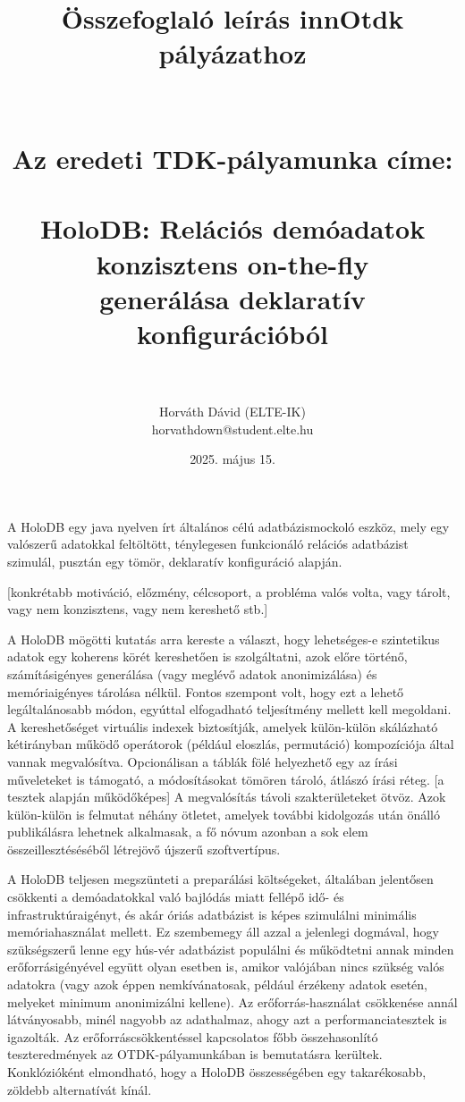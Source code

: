 \documentclass[12pt]{article}
\title{Összefoglaló leírás innOtdk pályázathoz \\ ~ \\ ~ \\ {\Large Az eredeti TDK-pályamunka címe: \\ ~ \\ HoloDB: Relációs demóadatok konzisztens on-the-fly \\ generálása deklaratív konfigurációból} \\ ~}
\author{Horváth Dávid (ELTE-IK) \\ horvathdown@student.elte.hu}
\date{2025. május 15.}
\begin{document}
\begin{titlepage}
\maketitle
\thispagestyle{empty}
\end{titlepage}

\cleardoublepage

A HoloDB egy java nyelven írt általános célú adatbázismockoló eszköz, mely egy valószerű adatokkal feltöltött, ténylegesen funkcionáló relációs adatbázist szimulál, pusztán egy tömör, deklaratív konfiguráció alapján.

[konkrétabb motiváció, előzmény, célcsoport, a probléma valós volta, vagy tárolt, vagy nem konzisztens, vagy nem kereshető stb.]

A HoloDB mögötti kutatás arra kereste a választ, hogy lehetséges-e szintetikus adatok egy koherens körét kereshetően is szolgáltatni, azok előre történő, számításigényes generálása (vagy meglévő adatok anonimizálása) és memóriaigényes tárolása nélkül. Fontos szempont volt, hogy ezt a lehető legáltalánosabb módon, egyúttal elfogadható teljesítmény mellett kell megoldani.
A kereshetőséget virtuális indexek biztosítják, amelyek külön-külön skálázható kétirányban működő operátorok (például eloszlás, permutáció) kompozíciója által vannak megvalósítva.
Opcionálisan a táblák fölé helyezhető egy az írási műveleteket is támogató, a módosításokat tömören tároló, átlászó írási réteg.
[a tesztek alapján működőképes]
A megvalósítás távoli szakterületeket ötvöz. Azok külön-külön is felmutat néhány ötletet, amelyek további kidolgozás után önálló publikálásra lehetnek alkalmasak, a fő nóvum azonban a sok elem összeillesztéséséből létrejövő újszerű szoftvertípus.

A HoloDB teljesen megszünteti a preparálási költségeket, általában jelentősen csökkenti a demóadatokkal való bajlódás miatt fellépő idő- és infrastruktúraigényt, és akár óriás adatbázist is képes szimulálni minimális memóriahasználat mellett.
Ez szembemegy áll azzal a jelenlegi dogmával, hogy szükségszerű lenne egy hús-vér adatbázist populálni és működtetni annak minden erőforrásigényével együtt olyan esetben is, amikor valójában nincs szükség valós adatokra (vagy azok éppen nemkívánatosak, például érzékeny adatok esetén, melyeket minimum anonimizálni kellene).
Az erőforrás-használat csökkenése annál látványosabb, minél nagyobb az adathalmaz, ahogy azt a performanciatesztek is igazolták.
Az erőforráscsökkentéssel kapcsolatos főbb összehasonlító teszteredmények az OTDK-pályamunkában is bemutatásra kerültek.
Konklózióként elmondható, hogy a HoloDB összességében egy takarékosabb, zöldebb alternatívát kínál.
\end{document}
